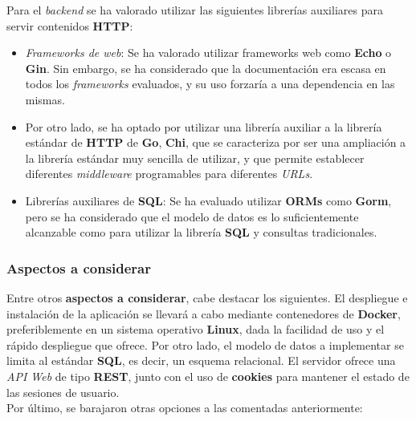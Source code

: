 \documentclass[11pt, a4paper, titlepage]{article}
\begin{document}
Para el \textit{backend} se ha valorado utilizar las siguientes librerías auxiliares para servir contenidos \textbf{HTTP}:


\begin{itemize}
    \item \textit{Frameworks de web}: Se ha valorado utilizar frameworks web como \textbf{Echo} o \textbf{Gin}. Sin embargo, se ha considerado que  la documentación era escasa en todos los \textit{frameworks} evaluados, y su uso forzaría a una dependencia en las mismas.

    \item Por otro lado, se ha optado por utilizar una librería auxiliar a la librería estándar de \textbf{HTTP} de \textbf{Go}, \textbf{Chi}, que se caracteriza por ser una ampliación a la librería estándar muy sencilla de utilizar, y que permite establecer diferentes \textit{middleware} programables para diferentes \textit{URLs}.

    \item Librerías auxiliares de \textbf{SQL}: Se ha evaluado utilizar \textbf{ORMs} como \textbf{Gorm}, pero se ha considerado que el modelo de datos es lo suficientemente alcanzable como para utilizar la librería \textbf{SQL} y consultas tradicionales.
\end{itemize}

\subsubsection{Aspectos a considerar}

Entre otros \textbf{aspectos a considerar}, cabe destacar los siguientes. El despliegue e instalación de la aplicación se llevará a cabo mediante contenedores de \textbf{Docker}, preferiblemente en un sistema operativo \textbf{Linux}, dada la facilidad de uso y el rápido despliegue que ofrece. Por otro lado, el modelo de datos a implementar se limita al estándar \textbf{SQL}, es decir, un esquema relacional. El servidor ofrece una \textit{API Web} de tipo \textbf{REST}, junto con el uso de \textbf{cookies} para mantener el estado de las sesiones de usuario. \\

Por último, se barajaron otras opciones a las comentadas anteriormente:
\end{document}
